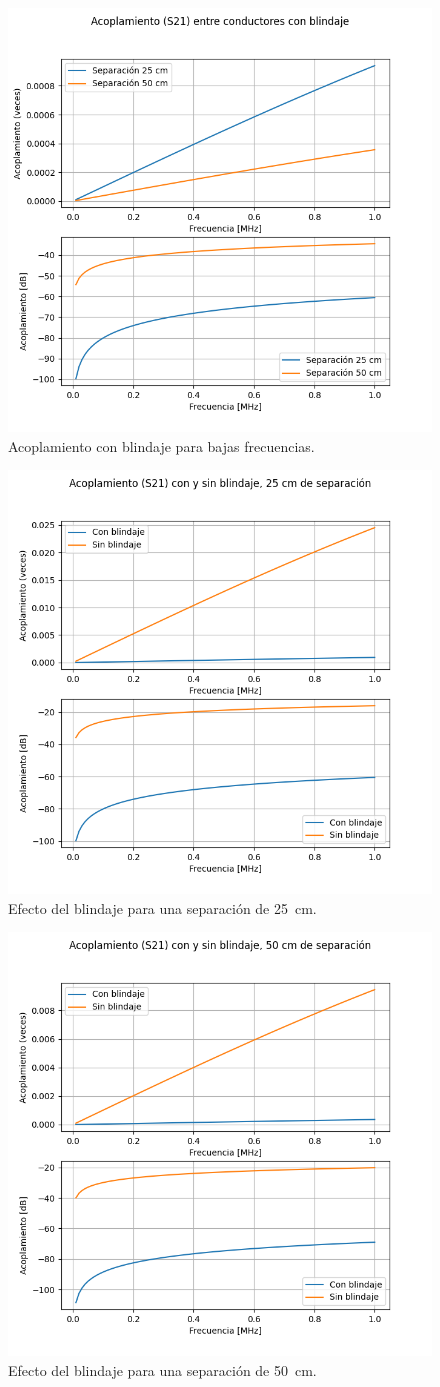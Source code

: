 \begin{figure}[ht]
  \centering
  \includegraphics[width=0.47\linewidth]{imagenes/acoplamiento_con_blindaje_resultados_bajas.png}
  \caption{Acoplamiento con blindaje para bajas frecuencias.}%
  \label{fig:imagenes/acoplamiento_con_blindaje_resultados_bajas}
\end{figure}

\begin{figure}[ht]
  \centering
  \includegraphics[width=0.6\linewidth]{imagenes/efecto_blindaje_25cm.png}
  \caption{Efecto del blindaje para una separación de \SI{25}{\cm}.}%
  \label{fig:imagenes/efecto_blindaje_25cm}
\end{figure}

\begin{figure}[ht]
  \centering
  \includegraphics[width=0.6\linewidth]{imagenes/efecto_blindaje_50cm.png}
  \caption{Efecto del blindaje para una separación de \SI{50}{\cm}.}%
  \label{fig:imagenes/efecto_blindaje_50cm}
\end{figure}

